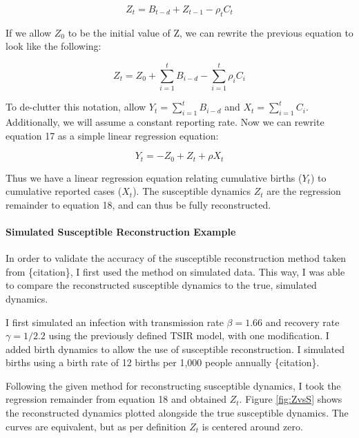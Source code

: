 \documentclass{article}
\begin{document}
\begin{equation}
Z_{t} = B_{t-d} + Z_{t-1} -  \rho_{t} C_{t}
\end{equation}

If we allow $Z_{0}$ to be the initial value of Z, we can rewrite the previous equation to look like the following:

\begin{equation}
Z_{t} = Z_{0} + \sum_{i=1}^{t} B_{i-d} - \sum_{i=1}^{t} \rho_{i}C_{i}
\end{equation}

To de-clutter this notation, allow $Y_{t}=\sum_{i=1}^{t} B_{i-d}$ and $X_{t}= \sum_{i=1}^{t}C_{i}$. Additionally, we will assume a constant reporting rate. Now we can rewrite equation 17 as a simple linear regression equation:

\begin{equation}
Y_{t} = -Z_{0} + Z_{t} + \rho X_{t}
\end{equation}

Thus we have a linear regression equation relating cumulative births ($Y_{t}$) to cumulative reported cases ($X_{t}$). The susceptible dynamics $Z_{t}$ are the regression remainder to equation 18, and can thus be fully reconstructed. 

\paragraph{Simulated Susceptible Reconstruction Example}
In order to validate the accuracy of the susceptible reconstruction method taken from \{citation\}, I first used the method on simulated data. This way, I was able to compare the reconstructed susceptible dynamics to the true, simulated dynamics. 

I first simulated an infection with transmission rate $\beta = 1.66$ and recovery rate $\gamma = 1/2.2$ using the previously defined TSIR model, with one modification. I added birth dynamics to allow the use of susceptible reconstruction. I simulated births using a birth rate of 12 births per 1,000 people annually \{citation\}. 

Following the given method for reconstructing susceptible dynamics, I took the regression remainder from equation 18 and obtained $Z_{t}$. Figure \ref{fig:ZvsS} shows the reconstructed dynamics plotted alongside the true susceptible dynamics. The curves are equivalent, but as per definition $Z_{t}$ is centered around zero. 
\end{document}
